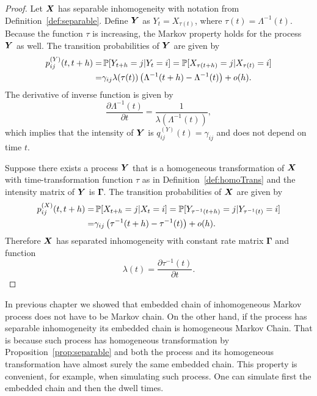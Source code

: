 {\begin{proof}
	Let $\bm{X}$ has separable inhomogeneity with notation from Definition~\ref{def:separable}. Define $\bm{Y}$ as $Y_t = X_{\tau(t)}$, where $\tau(t) = \Lambda^{-1} (t)$. Because the function $\tau$ is increasing, the Markov property holds for the process $\bm{Y}$ as well. The transition probabilities of $\bm{Y}$ are given by
	\begin{align*}
		p_{ij}^{(Y)} (t, t+h)
		=& \operatorname{\mathbb{P}} [ Y_{t+h} = j \vert Y_t = i ]
		= \operatorname{\mathbb{P}} [ X_{\tau (t+h)} = j \vert X_{\tau (t)} = i ] \\
		=& \gamma_{ij} \lambda(\tau (t)) \left( \Lambda^{-1} (t+h) - \Lambda^{-1} (t) \right) + o(h).
	\end{align*}
	The derivative of inverse function is given by
	\[
		\frac{\partial \Lambda^{-1} (t)}{\partial t} = \frac{1}{\lambda (\Lambda^{-1} (t))},
	\]
	which implies that the intensity of $\bm{Y}$ is $q_{ij}^{(Y)} (t) = \gamma_{ij}$ and does not depend on time $t$.
	
	Suppose there exists a process $\bm{Y}$ that is a homogeneous transformation of $\bm{X}$ with time-transformation function $\tau$ as in Definition~\ref{def:homoTrans} and the intensity matrix of $\bm{Y}$ is $\bm{\Gamma}$. The transition probabilities of $\bm{X}$ are given by
		\begin{align*}
		p_{ij}^{(X)} (t, t+h)
		=& \operatorname{\mathbb{P}} [ X_{t+h} = j \vert X_t = i ]
		= \operatorname{\mathbb{P}} [ Y_{\tau^{-1} (t+h)} = j \vert Y_{\tau^{-1} (t)} = i ] \\
		=& \gamma_{ij} \left( \tau^{-1} (t+h) - \tau^{-1} (t) \right) + o(h).
	\end{align*}
	Therefore $\bm{X}$ has separated inhomogeneity with constant rate matrix $\bm{\Gamma}$ and function
	\[
		\lambda(t) = \frac{\partial \tau^{-1} (t)}{\partial t}.
	\]

\end{proof}

In previous chapter we showed that embedded chain of inhomogeneous Markov process does not have to be Markov chain.
On the other hand, if the process has separable inhomogeneity its embedded chain is homogeneous Markov Chain.
That is because such process has homogeneous transformation by Proposition~\ref{prop:separable} and both the process and its homogeneous transformation have almost surely the same embedded chain.
This property is convenient, for example, when simulating such process.
One can simulate first the embedded chain and then the dwell times.

	
	




}
